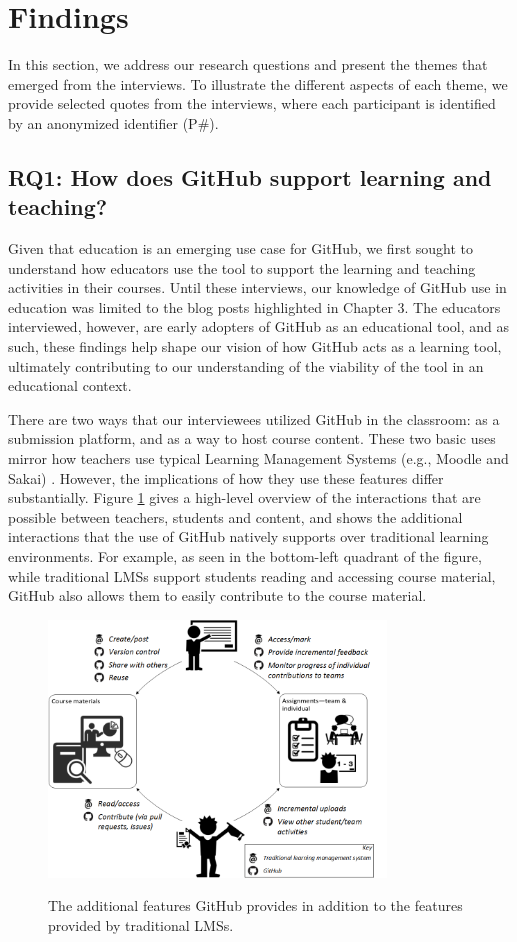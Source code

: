 \section{Findings}
\label{sec:results}
In this section, we address our research questions and present the themes that emerged from the interviews. To illustrate the different aspects of each theme, we provide selected quotes from the interviews, where each participant is identified by an anonymized identifier (P\#).

\subsection{RQ1: How does GitHub support learning and teaching?}
Given that education is an emerging use case for GitHub, we first sought to understand how educators use the tool to support the learning and teaching activities in their courses. Until these interviews, our knowledge of GitHub use in education was limited to the blog posts highlighted in Chapter 3. The educators interviewed, however, are early adopters of GitHub as an educational tool, and as such, these findings help shape our vision of how GitHub acts as a learning tool, ultimately contributing to our understanding of the viability of the tool in an educational context.

There are two ways that our interviewees utilized GitHub in the classroom: as a submission platform, and as a way to host course content. These two basic uses mirror how teachers use typical Learning Management Systems (e.g., Moodle and Sakai) \cite{malikowski2007model}. However, the implications of how they use these features differ substantially. Figure \ref{fig:edu_workflow} gives a high-level overview of the interactions that are possible between teachers, students and content, and shows the additional interactions that the use of GitHub natively supports over traditional learning environments. For example, as seen in the bottom-left quadrant of the figure, while traditional LMSs support students reading and accessing course material, GitHub also allows them to easily contribute to the course material.

\begin{figure}[h!]
 \caption{The additional features GitHub provides in addition to the features provided by traditional LMSs.}
 \centering
   \includegraphics[width=0.8\textwidth]{EduWorkflowLargeType}
 \label{fig:edu_workflow}
\end{figure}

